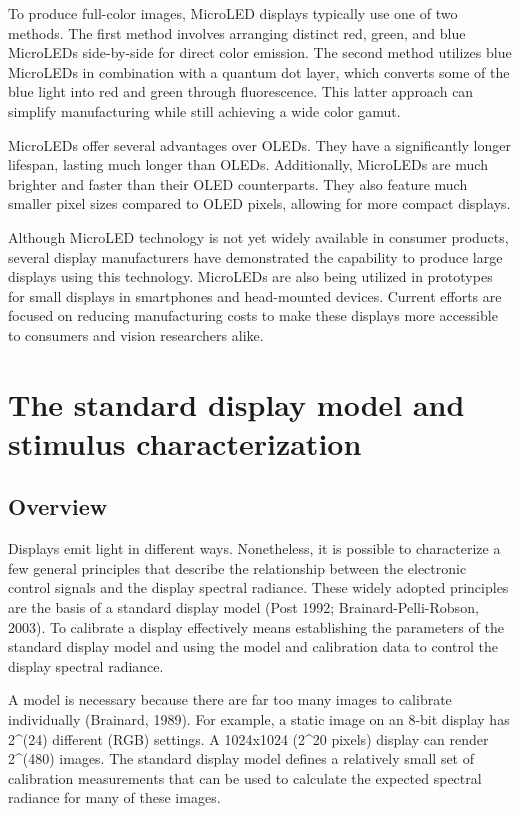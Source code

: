 \documentclass[
  letterpaper,
]{book}
\begin{document}
To produce full-color images, MicroLED displays typically use one of two
methods. The first method involves arranging distinct red, green, and
blue MicroLEDs side-by-side for direct color emission. The second method
utilizes blue MicroLEDs in combination with a quantum dot layer, which
converts some of the blue light into red and green through fluorescence.
This latter approach can simplify manufacturing while still achieving a
wide color gamut.

MicroLEDs offer several advantages over OLEDs. They have a significantly
longer lifespan, lasting much longer than OLEDs. Additionally, MicroLEDs
are much brighter and faster than their OLED counterparts. They also
feature much smaller pixel sizes compared to OLED pixels, allowing for
more compact displays.

Although MicroLED technology is not yet widely available in consumer
products, several display manufacturers have demonstrated the capability
to produce large displays using this technology. MicroLEDs are also
being utilized in prototypes for small displays in smartphones and
head-mounted devices. Current efforts are focused on reducing
manufacturing costs to make these displays more accessible to consumers
and vision researchers alike.

\section{The standard display model and stimulus
characterization}\label{the-standard-display-model-and-stimulus-characterization}

\subsection{Overview}\label{overview}

Displays emit light in different ways. Nonetheless, it is possible to
characterize a few general principles that describe the relationship
between the electronic control signals and the display spectral
radiance. These widely adopted principles are the basis of a standard
display model (Post 1992; Brainard-Pelli-Robson, 2003). To calibrate a
display effectively means establishing the parameters of the standard
display model and using the model and calibration data to control the
display spectral radiance.

A model is necessary because there are far too many images to calibrate
individually (Brainard, 1989). For example, a static image on an 8-bit
display has 2\^{}(24) different (RGB) settings. A 1024x1024 (2\^{}20
pixels) display can render 2\^{}(480) images. The standard display model
defines a relatively small set of calibration measurements that can be
used to calculate the expected spectral radiance for many of these
images.
\end{document}
